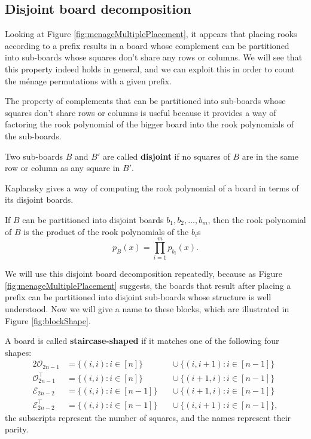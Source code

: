 \subsection{Disjoint board decomposition}
Looking at Figure \ref{fig:menageMultiplePlacement},
it appears that placing rooks according to a prefix
results in a board whose complement can be partitioned into
sub-boards whose squares don't share any rows or columns.
We will see that this property indeed holds in general,
and we can exploit this in order to count the m\'enage permutations
with a given prefix.



The property of complements that can be partitioned into sub-boards
whose squares don't share rows or columns is useful because it provides
a way of factoring the rook polynomial of the bigger board into the rook
polynomials of the sub-boards.
\begin{definition}
  Two sub-boards $B$ and $B'$ are called \textbf{disjoint} if no squares of $B$ are
  in the same row or column as any square in $B'$.
\end{definition}

Kaplansky gives a way of computing the rook polynomial of a board in terms of
its disjoint boards.
\begin{theorem}
  If $B$ can be partitioned into disjoint boards $b_1, b_2, \dots, b_m$,
  then the rook polynomial of $B$ is the product of the rook polynomials of
  the $b_i$s \[
    p_B(x) = \prod_{i=1}^m p_{b_i}(x).
  \]
\end{theorem}

We will use this disjoint board decomposition repeatedly, because as
Figure \ref{fig:menageMultiplePlacement} suggests, the boards that result
after placing a prefix can be partitioned into disjoint sub-boards whose
structure is well understood. Now we will give a name to these blocks,
which are illustrated in Figure \ref{fig:blockShape}.



\begin{definition}
  A board is called \textbf{staircase-shaped} if it matches one of the
  following four shapes:
  \begin{alignat*}{2}
    \mathcal{O}_{2n-1}           &= \{(i,i) : i \in [n]\}    &&\cup\ \{(i,i+1) : i \in [n-1]\} \\
    \mathcal{O}_{2n-1}^\intercal &= \{(i,i) : i \in [n]\}    &&\cup\ \{(i+1,i) : i \in [n-1]\} \\
    \mathcal{E}_{2n-2}           &= \{(i,i) : i \in [n-1]\}\ &&\cup\ \{(i+1,i) : i \in [n-1]\} \\
    \mathcal{E}_{2n-2}^\intercal &= \{(i,i) : i \in [n-1]\}\ &&\cup\ \{(i,i+1) : i \in [n-1]\},
  \end{alignat*}
  the subscripts represent the number of squares, and the names represent their
  parity.
  \label{def:staircaseShaped}
\end{definition}

